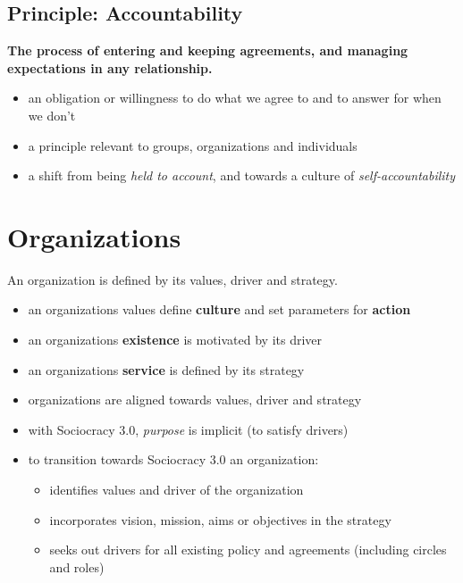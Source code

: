 \section{Principle: Accountability}
\label{principle:accountability}

\textbf{The process of entering and keeping agreements, and managing expectations in any relationship.}

\begin{itemize}
\item an obligation or willingness to do what we agree to and to answer for when we don’t

\item a principle relevant to groups, organizations and individuals

\item a shift from being \emph{held to account}, and towards a culture of \emph{self-accountability}

\end{itemize}

\chapter{Organizations}
\label{organizations}

An organization is defined by its values, driver and strategy.

\begin{itemize}
\item an organizations values define \textbf{culture} and set parameters for \textbf{action}

\item an organizations \textbf{existence} is motivated by its driver

\item an organizations \textbf{service} is defined by its strategy

\item organizations are aligned towards values, driver and strategy

\item with Sociocracy 3.0, \emph{purpose} is implicit (to satisfy drivers)

\item to transition towards Sociocracy 3.0 an organization:

\begin{itemize}
\item identifies values and driver of the organization

\item incorporates vision, mission, aims or objectives in the strategy

\item seeks out drivers for all existing policy and agreements (including circles and roles)

\end{itemize}

\end{itemize}

